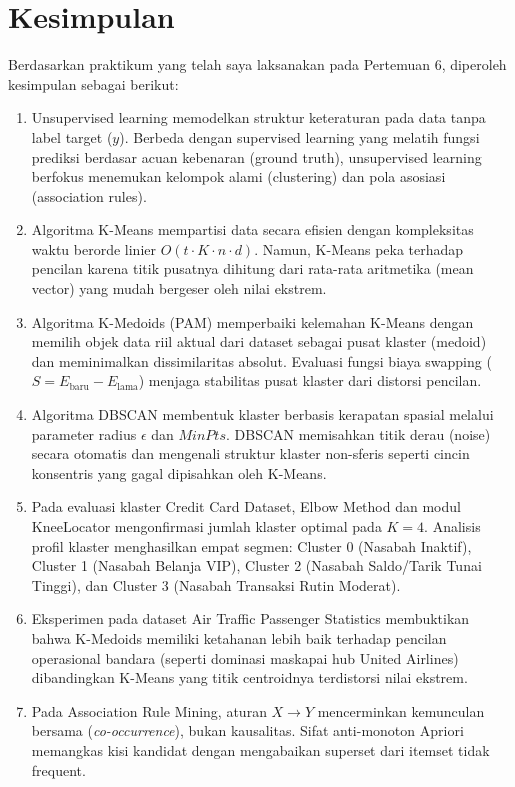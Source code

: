 \documentclass[a4paper,oneside,12pt]{report}
\begin{document}
\chapter{Kesimpulan}
Berdasarkan praktikum yang telah saya laksanakan pada Pertemuan 6, diperoleh kesimpulan sebagai berikut:
\begin{enumerate}[noitemsep, topsep=2pt, parsep=0pt, partopsep=0pt]
    \item Unsupervised learning memodelkan struktur keteraturan pada data tanpa label target ($y$). Berbeda dengan supervised learning yang melatih fungsi prediksi berdasar acuan kebenaran (ground truth), unsupervised learning berfokus menemukan kelompok alami (clustering) dan pola asosiasi (association rules).
    \item Algoritma K-Means mempartisi data secara efisien dengan kompleksitas waktu berorde linier $O(t \cdot K \cdot n \cdot d)$. Namun, K-Means peka terhadap pencilan karena titik pusatnya dihitung dari rata-rata aritmetika (mean vector) yang mudah bergeser oleh nilai ekstrem.
    \item Algoritma K-Medoids (PAM) memperbaiki kelemahan K-Means dengan memilih objek data riil aktual dari dataset sebagai pusat klaster (medoid) dan meminimalkan dissimilaritas absolut. Evaluasi fungsi biaya swapping ($S = E_{\text{baru}} - E_{\text{lama}}$) menjaga stabilitas pusat klaster dari distorsi pencilan.
    \item Algoritma DBSCAN membentuk klaster berbasis kerapatan spasial melalui parameter radius $\epsilon$ dan $\mathit{MinPts}$. DBSCAN memisahkan titik derau (noise) secara otomatis dan mengenali struktur klaster non-sferis seperti cincin konsentris yang gagal dipisahkan oleh K-Means.
    \item Pada evaluasi klaster Credit Card Dataset, Elbow Method dan modul KneeLocator mengonfirmasi jumlah klaster optimal pada $K = 4$. Analisis profil klaster menghasilkan empat segmen: Cluster 0 (Nasabah Inaktif), Cluster 1 (Nasabah Belanja VIP), Cluster 2 (Nasabah Saldo/Tarik Tunai Tinggi), dan Cluster 3 (Nasabah Transaksi Rutin Moderat).
    \item Eksperimen pada dataset Air Traffic Passenger Statistics membuktikan bahwa K-Medoids memiliki ketahanan lebih baik terhadap pencilan operasional bandara (seperti dominasi maskapai hub United Airlines) dibandingkan K-Means yang titik centroidnya terdistorsi nilai ekstrem.
    \item Pada Association Rule Mining, aturan $X \rightarrow Y$ mencerminkan kemunculan bersama (\textit{co-occurrence}), bukan kausalitas. Sifat anti-monoton Apriori memangkas kisi kandidat dengan mengabaikan superset dari itemset tidak frequent.
\end{enumerate}
\end{document}
